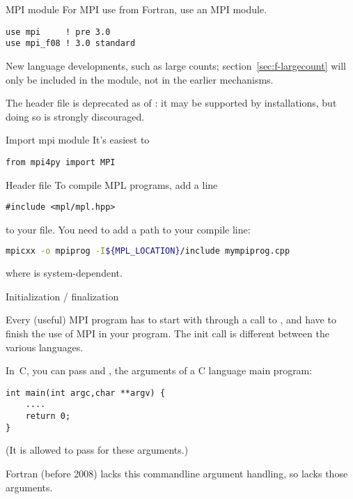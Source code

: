 \begin{fortrannote}{MPI module}
For MPI use from Fortran, use an MPI module.
\begin{verbatim}
use mpi     ! pre 3.0
use mpi_f08 ! 3.0 standard
\end{verbatim}

  New language developments, such as large counts; section~\ref{sec:f-largecount}
  will only be included in the  module,
  not in the earlier mechanisms.

  The header file  is deprecated as of :
  it may be supported by installations, but doing so is strongly discouraged.
\end{fortrannote}

\begin{pythonnote}{Import mpi module}
  It's easiest to
\begin{lstlisting}
from mpi4py import MPI
\end{lstlisting}
\end{pythonnote}

\begin{mplnote}{Header file}
  To compile MPL programs, add a line
\begin{lstlisting}
#include <mpl/mpl.hpp>
\end{lstlisting}
  to your file.
  You need to add a path to your compile line:
\begin{lstlisting}[language=bash]
mpicxx -o mpiprog -I${MPL_LOCATION}/include mympiprog.cpp
\end{lstlisting}
where  is system-dependent.
\end{mplnote}

 {Initialization / finalization}
\label{sec:mpi-init}

Every (useful) MPI program has to start with 
through a call to
, and have
 to finish the use of MPI in your program.
The init call is different between the various languages.

In~C, you can pass  and , the arguments
of a C language main program:
 \begin{lstlisting}
int main(int argc,char **argv) {
    ....
    return 0;
}
\end{lstlisting}
(It is allowed to pass  for these arguments.)

Fortran (before 2008) lacks this commandline argument handling,
so  lacks those arguments.

